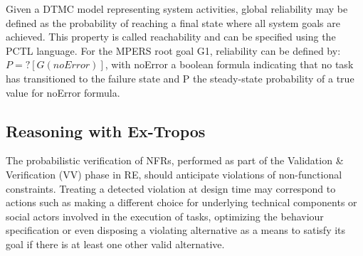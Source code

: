 Given a DTMC model representing system activities, global reliability may be defined as the probability of reaching a final state where all system goals are achieved. This property is called reachability and can be specified using the PCTL language. For the MPERS root goal G1, reliability can be defined by: $ P=? [ G (noError) ] $, with noError a boolean formula indicating that no task has transitioned to the failure state and P the steady-state probability of a true value for noError formula.


%
%
%




\subsection{Reasoning with Ex-Tropos}

The probabilistic verification of NFRs, performed as part of the Validation \& Verification (VV) phase in RE, should anticipate violations of non-functional constraints. Treating a detected violation at design time may correspond to actions such as making a different choice for underlying technical components or social actors involved in the execution of tasks, optimizing the behaviour specification or even disposing a violating alternative as a means to satisfy its goal if there is at least one other valid alternative. 


